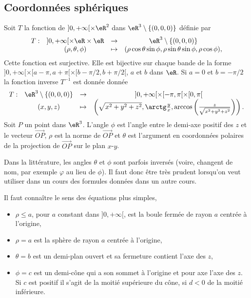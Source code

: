 \subsection{Coordonnées sphériques}
Soit $T$ la fonction de $]0, +\infty[\times \eR^2$ dans $\eR^3\setminus\{(0,0,0)\}$ définie par
\begin{equation}
  \begin{array}{lccc}
    T: &]0, +\infty[\times \eR\times \eR & \to & \eR^3\setminus\{(0,0,0)\}\\
 & (\rho, \theta, \phi)&\mapsto& (\rho\cos \theta\sin \phi, \rho \sin \theta\sin \phi, \rho\cos \phi),
  \end{array}
\end{equation}
Cette fonction est surjective. Elle est bijective sur chaque bande de la forme  $]0, +\infty[\times [a-\pi,a+\pi[\times [b-\pi/2, b+\pi/2[$, $a$ et $b$ dans $\eR$.  Si $a =0$ et $b=-\pi/2$ la fonction inverse $T^{-1}$ est donnée donnée
\begin{equation}
  \begin{array}{lccc}
    T: &\eR^3\setminus\{(0,0,0)\} & \to & ]0, +\infty[\times [-\pi,\pi[\times [0, \pi[\\
 & (x,y,z)&\mapsto& \left(\sqrt{x^2+y^2+z^2}, \arctg \frac{y}{x}, \arccos \left(\frac{z}{\sqrt{x^2+y^2+z^2}}\right)\right). 
  \end{array}
\end{equation}
Soit $ P$ un point dans $\eR^3$. L'angle $\phi$ est l'angle entre le demi-axe positif des $z$ et le vecteur $\overrightarrow{OP}$, $\rho$ est la norme de $\overrightarrow{OP}$ et $\theta$ est l'argument en coordonnées polaires de la projection de $\overrightarrow{OP}$ sur le plan $x$-$y$.  

\begin{remark}
	Dans la littérature, les angles $\theta$ et $\phi$ sont parfois inversés (voire, changent de nom, par exemple $\varphi$ au lieu de $\phi$). Il faut donc être très prudent lorsqu'on veut utiliser dans un cours des formules données dans un autre cours.
\end{remark}

\begin{example}
Il faut connaître le sens des équations plus simples, 
\begin{itemize}
\item $\rho\leq a$, pour $a$ constant dans  $]0, +\infty[$, est la boule fermée de rayon $a$ centrée à l'origine, 
\item $\rho= a$ est  la sphère de rayon $a$ centrée à l'origine,
\item $\theta = b$ est un demi-plan ouvert et sa fermeture contient l'axe des $z$,
\item $\phi= c$ est un demi-cône qui a  son sommet à l'origine et  pour axe l'axe des $z$.  Si $c$ est positif  il s'agit  de la moitié supérieure du cône, si $d<0$ de la moitié inférieure. 
\end{itemize}
 \end{example}

